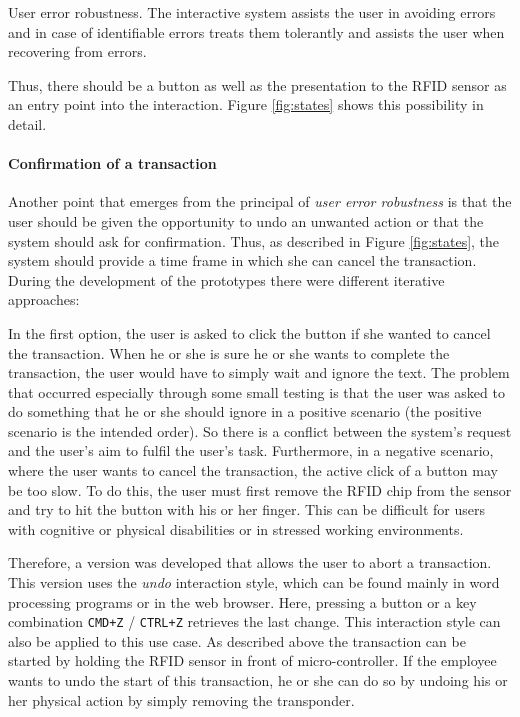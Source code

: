 \begin{principle}{User error robustness.}
The interactive system assists the user in avoiding errors and in case of identifiable errors treats them tolerantly and assists the user when recovering from errors. \cite{ISO:9241-110:2020}
\label{prin:UserErrorRobustness}
\end{principle}

Thus, there should be a button as well as the presentation to the RFID sensor as an entry point into the interaction. Figure \ref{fig:states} shows this possibility in detail.

\paragraph{Confirmation of a transaction}

Another point that emerges from the principal of \textit{user error robustness} is that the user should be given the opportunity to undo an unwanted action or that the system should ask for confirmation. Thus, as described in Figure \ref{fig:states}, the system should provide a time frame in which she can cancel the transaction. During the development of the prototypes there were different iterative approaches:

In the first option, the user is asked to click the button if she wanted to cancel the transaction. When he or she is sure he or she wants to complete the transaction, the user would have to simply wait and ignore the text. The problem that occurred especially through some small testing is that the user was asked to do something that he or she should ignore in a positive scenario (the positive scenario is the intended order). So there is a conflict between the system's request and the user's aim to fulfil the user's task. Furthermore, in a negative scenario, where the user wants to cancel the transaction, the active click of a button may be too slow. To do this, the user must first remove the RFID chip from the sensor and try to hit the button with his or her finger. This can be difficult for users with cognitive or physical disabilities or in stressed working environments.

Therefore, a version was developed that allows the user to abort a transaction. This version uses the \textit{undo} interaction style, which can be found mainly in word processing programs or in the web browser. Here, pressing a button or a key combination \texttt{CMD+Z} / \texttt{CTRL+Z} retrieves the last change. This interaction style can also be applied to this use case. As described above the transaction can be started by holding the RFID sensor in front of micro-controller. If the employee wants to undo the start of this transaction, he or she can do so by undoing his or her physical action by simply removing the transponder.

